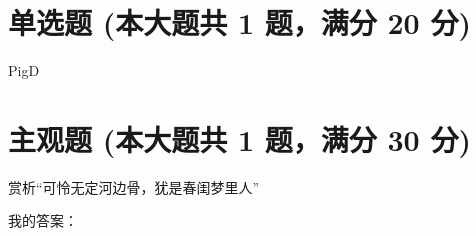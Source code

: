 \documentclass[12pt, a4paper, addpoints, answers]{exam}
\begin{document}
\hspace{5cm}

\section{\normalsize{单选题 (本大题共 1 题，满分 20 分)}}
\hspace{1.5cm}

\begin{questions}
\question[20] PigD

\begin{oneparchoices}
\end{oneparchoices}

\answerline

\end{questions}

\hspace{5cm}

\section{\normalsize{主观题 (本大题共 1 题，满分 30 分)}}
\hspace{1.5cm}

\begin{questions}
\question[30] 赏析“可怜无定河边骨，犹是春闺梦里人”


我的答案：

\end{questions}
\end{document}
